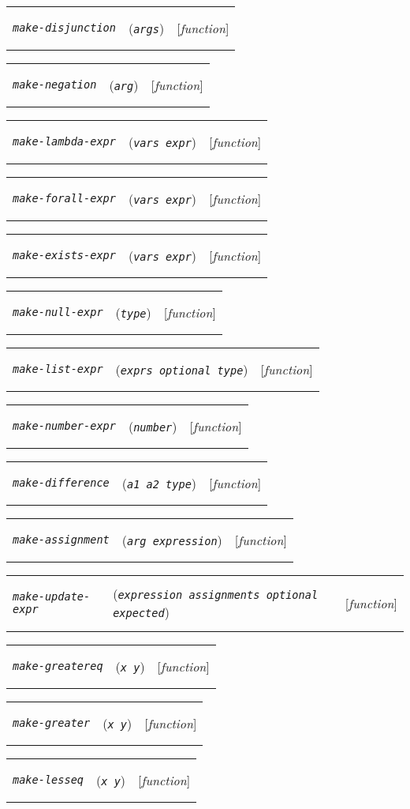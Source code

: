 \documentclass[12pt]{book}
\makeatletter
\def\ampoptional{{\smaller\sc {\smaller\smaller \&}optional\ }}
\newenvironment{function}[3]%
{\par\noindent\begin{boxedminipage}{\textwidth}%
 \par\noindent\begin{tabularx}{\linewidth}{l>{\raggedright}Xr}%
 \functionhtgt{#1}&(\texttt{\textit{#2}})&[\emph{#3}]%
 \end{tabularx}\par\flushright\begin{minipage}{.97\textwidth}}
{\end{minipage}\end{boxedminipage}}
\newcommand{\functionnm}[1]{\texttt{\textit{#1}}}
\newcommand{\functionhtgt}[1]{\hypertarget{#1}{\functionnm{#1}}\index{#1@\functionnm{#1}|underline}}
\newenvironment{lispfunction}[2]%
{\begin{function}{#1}{#2}{function}}{\end{function}}
\makeatother
\begin{document}
\begin{lispfunction}{make-disjunction}{args}
\end{lispfunction}

\begin{lispfunction}{make-negation}{arg}
\end{lispfunction}

\begin{lispfunction}{make-lambda-expr}{vars expr}
\end{lispfunction}

\begin{lispfunction}{make-forall-expr}{vars expr}
\end{lispfunction}

\begin{lispfunction}{make-exists-expr}{vars expr}
\end{lispfunction}

\begin{lispfunction}{make-null-expr}{type}
\end{lispfunction}

\begin{lispfunction}{make-list-expr}{exprs \ampoptional type}
\end{lispfunction}

\begin{lispfunction}{make-number-expr}{number}
\end{lispfunction}

\begin{lispfunction}{make-difference}{a1 a2 type}
\end{lispfunction}

\begin{lispfunction}{make-assignment}{arg expression}
\end{lispfunction}

\begin{lispfunction}{make-update-expr}{expression assignments \ampoptional
expected}
\end{lispfunction}

\begin{lispfunction}{make-greatereq}{x y}
\end{lispfunction}

\begin{lispfunction}{make-greater}{x y}
\end{lispfunction}

\begin{lispfunction}{make-lesseq}{x y}
\end{lispfunction}
\end{document}
